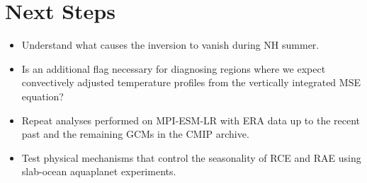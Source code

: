 \documentclass[11pt]{article}
\begin{document}
\section{Next Steps}
\label{sec:orgdc5106c}
\begin{itemize}
\item Understand what causes the inversion to vanish during NH summer.
\item Is an additional flag necessary for diagnosing regions where we expect convectively adjusted temperature profiles from the vertically integrated MSE equation?
\item Repeat analyses performed on MPI-ESM-LR with ERA data up to the recent past and the remaining GCMs in the CMIP archive.
\item Test physical mechanisms that control the seasonality of RCE and RAE using slab-ocean aquaplanet experiments.
\end{itemize}



\end{document}
